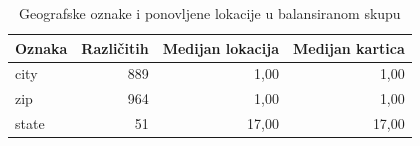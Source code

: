 \begin{table}[H]\centering\small
\caption{Geografske oznake i ponovljene lokacije u balansiranom skupu}
\begin{tabularx}{\linewidth}{@{}Yrrr@{}}\toprule
Oznaka & Različitih & Medijan lokacija & Medijan kartica \\ \midrule
city & 889 & 1,00 & 1,00 \\
zip & 964 & 1,00 & 1,00 \\
state & 51 & 17,00 & 17,00 \\
\bottomrule\end{tabularx}\end{table}
